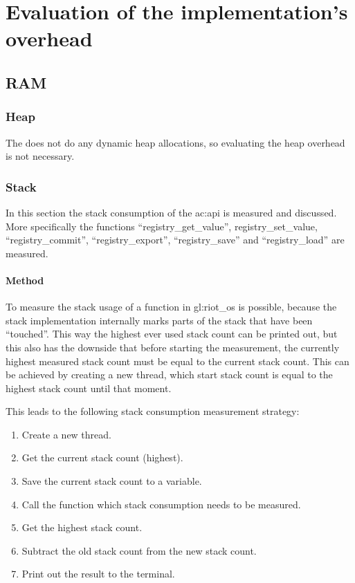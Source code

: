 \chapter{Evaluation of the implementation's overhead}
\label{chapter:evaluation}

\section{RAM}
\label{sec:evaluation:ram_overhead}

\subsection{Heap}

The  does not do any dynamic heap allocations, so evaluating the heap overhead is not necessary.

\subsection{Stack}

In this section the stack consumption of the  \gls{ac:api} is measured and discussed.
More specifically the functions ``registry\_get\_value'', registry\_set\_value, ``registry\_commit'', ``registry\_export'', ``registry\_save'' and ``registry\_load'' are measured.

\subsubsection{Method}

To measure the stack usage of a function in \gls{gl:riot_os} is possible, because the stack implementation internally marks parts of the stack that have been ``touched''.
This way the highest ever used stack count can be printed out, but this also has the downside that before starting the measurement, the currently highest measured stack count must be equal to the current stack count.
This can be achieved by creating a new thread, which start stack count is equal to the highest stack count until that moment.

This leads to the following stack consumption measurement strategy:
\begin{enumerate}
    \item Create a new thread.
    \item Get the current stack count (highest).
    \item Save the current stack count to a variable.
    \item Call the function which stack consumption needs to be measured.
    \item Get the highest stack count.
    \item Subtract the old stack count from the new stack count.
    \item Print out the result to the terminal.
\end{enumerate}


